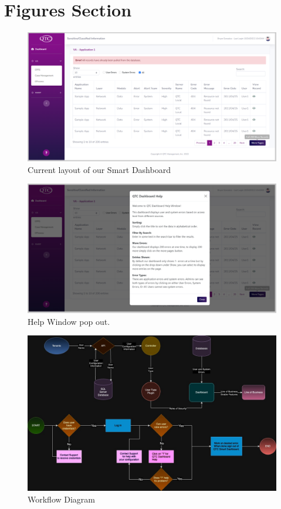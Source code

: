 \documentclass[12pt]{article}
\begin{document}
\section{Figures Section}
\begin{figure}[h]
\caption{Current layout of our Smart Dashboard}
\includegraphics[width=\textwidth]{General}
\end{figure}

\begin{figure}[h]
\caption{Help Window pop out.}
\includegraphics[width=\textwidth]{Help_Window}
\end{figure}

\begin{figure}[h]
\caption{Workflow Diagram}
\includegraphics[width=\textwidth]{WorkFlowDiagram}
\end{figure}
\end{document}
